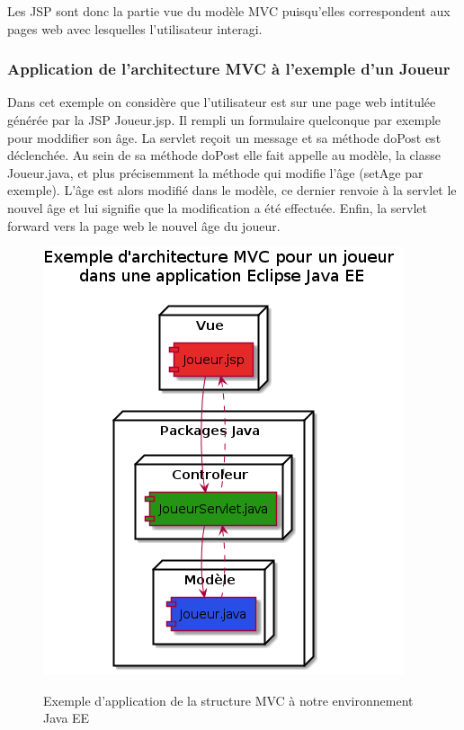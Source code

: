 Les JSP sont donc la partie vue du modèle MVC puisqu'elles correspondent aux pages web avec lesquelles l'utilisateur interagi.

\subsubsection{Application de l'architecture MVC à l'exemple d'un Joueur}
Dans cet exemple on considère que l'utilisateur est sur une page web intitulée générée par la JSP Joueur.jsp. Il rempli un formulaire quelconque par exemple pour moddifier son âge. La servlet reçoit un message et sa méthode doPost est déclenchée. Au sein de sa méthode doPost elle fait appelle au modèle, la classe Joueur.java, et plus précisemment la méthode qui modifie l'âge (setAge par exemple). L'âge est alors modifié dans le modèle, ce dernier renvoie à la servlet le nouvel âge et lui signifie que la modification a été effectuée. Enfin, la servlet forward vers la page web le nouvel âge du joueur.
\begin{figure}[H]
  \center
  \includegraphics[scale=0.5]{../graph/exempleMVC.png} \\
  \caption{Exemple d'application de la structure MVC à notre environnement Java EE}
\end{figure}
